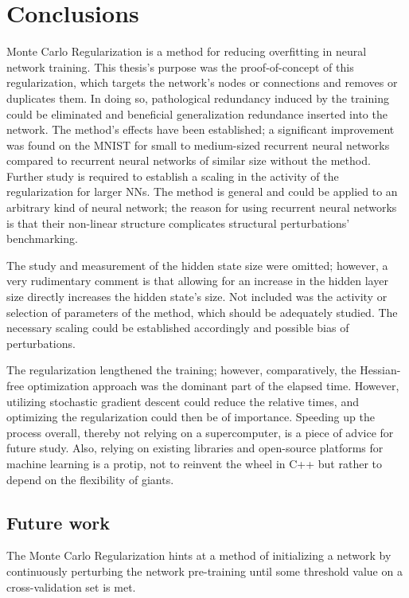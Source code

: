 \chapter{Conclusions}

Monte Carlo Regularization is a method for reducing overfitting in neural network training. This thesis's purpose was the proof-of-concept of this regularization, which targets the network's nodes or connections and removes or duplicates them. In doing so, pathological redundancy induced by the training could be eliminated and beneficial generalization redundance inserted into the network. The method's effects have been established; a significant improvement was found on the MNIST for small to medium-sized recurrent neural networks compared to recurrent neural networks of similar size without the method. Further study is required to establish a scaling in the activity of the regularization for larger NNs. The method is general and could be applied to an arbitrary kind of neural network; the reason for using recurrent neural networks is that their non-linear structure complicates structural perturbations' benchmarking.

The study and measurement of the hidden state size were omitted; however, a very rudimentary comment is that allowing for an increase in the hidden layer size directly increases the hidden state's size. Not included was the activity or selection of parameters of the method, which should be adequately studied. The necessary scaling could be established accordingly and possible bias of perturbations. 

The regularization lengthened the training; however, comparatively, the Hessian-free optimization approach was the dominant part of the elapsed time. However, utilizing stochastic gradient descent could reduce the relative times, and optimizing the regularization could then be of importance. Speeding up the process overall, thereby not relying on a supercomputer, is a piece of advice for future study. Also, relying on existing libraries and open-source platforms for machine learning is a protip, not to reinvent the wheel in C++ but rather to depend on the flexibility of giants.

\section{Future work}

The Monte Carlo Regularization hints at a method of initializing a network by continuously perturbing the network pre-training until some threshold value on a cross-validation set is met. 

